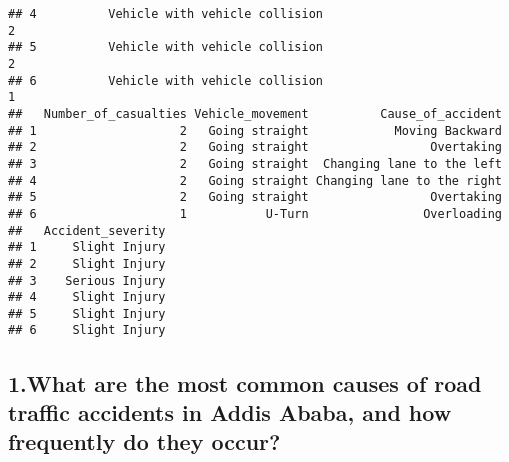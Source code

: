 \documentclass[
]{article}
\newenvironment{Shaded}{\begin{snugshade}}{\end{snugshade}}
\newcommand{\CommentTok}[1]{\textcolor[rgb]{0.56,0.35,0.01}{\textit{#1}}}
\newcommand{\FunctionTok}[1]{\textcolor[rgb]{0.13,0.29,0.53}{\textbf{#1}}}
\newcommand{\NormalTok}[1]{#1}
\newcommand{\OtherTok}[1]{\textcolor[rgb]{0.56,0.35,0.01}{#1}}
\newcommand{\SpecialCharTok}[1]{\textcolor[rgb]{0.81,0.36,0.00}{\textbf{#1}}}
\newcommand{\StringTok}[1]{\textcolor[rgb]{0.31,0.60,0.02}{#1}}
\begin{document}
\begin{verbatim}
## 4          Vehicle with vehicle collision                           2
## 5          Vehicle with vehicle collision                           2
## 6          Vehicle with vehicle collision                           1
##   Number_of_casualties Vehicle_movement          Cause_of_accident
## 1                    2   Going straight            Moving Backward
## 2                    2   Going straight                 Overtaking
## 3                    2   Going straight  Changing lane to the left
## 4                    2   Going straight Changing lane to the right
## 5                    2   Going straight                 Overtaking
## 6                    1           U-Turn                Overloading
##   Accident_severity
## 1     Slight Injury
## 2     Slight Injury
## 3    Serious Injury
## 4     Slight Injury
## 5     Slight Injury
## 6     Slight Injury
\end{verbatim}

\hypertarget{what-are-the-most-common-causes-of-road-traffic-accidents-in-addis-ababa-and-how-frequently-do-they-occur}{%
\subsection{1.What are the most common causes of road traffic accidents
in Addis Ababa, and how frequently do they
occur?}\label{what-are-the-most-common-causes-of-road-traffic-accidents-in-addis-ababa-and-how-frequently-do-they-occur}}

\begin{Shaded}
\end{Shaded}
\end{document}
